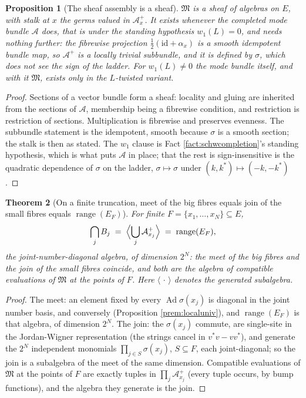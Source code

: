 \documentclass[11pt]{article}
\newtheorem{theorem}{Theorem}[section]
\newtheorem{proposition}[theorem]{Proposition}
\theoremstyle{definition}
\newcommand{\id}{\mathrm{id}}
\newcommand{\shL}{L}
\newcommand{\Aa}{\mathcal{A}}
\begin{document}
\begin{proposition}[The sheaf assembly is a sheaf]\label{prop:mlsheaf}
$\mathfrak{M}$ is a sheaf of algebras on $E$, with stalk at $x$ the germs valued in $\Aa_x^{+}$. It exists whenever the completed mode bundle $\Aa$ does, that is under the standing hypothesis $w_1(\shL) = 0$, and needs nothing further: the fibrewise projection $\tfrac12(\id + \alpha_x)$ is a smooth idempotent bundle map, so $\Aa^{+}$ is a locally trivial subbundle, and it is defined by $\sigma$, which does not see the sign of the ladder. For $w_1(\shL) \neq 0$ the mode bundle itself, and with it $\mathfrak{M}$, exists only in the $\shL$-twisted variant.
\end{proposition}

\begin{proof}
Sections of a vector bundle form a sheaf: locality and gluing are inherited from the sections of $\Aa$, membership being a fibrewise condition, and restriction is restriction of sections. Multiplication is fibrewise and preserves evenness. The subbundle statement is the idempotent, smooth because $\sigma$ is a smooth section; the stalk is then as stated. The $w_1$ clause is Fact \ref{fact:schwcompletion}'s standing hypothesis, which is what puts $\Aa$ in place; that the rest is sign-insensitive is the quadratic dependence of $\sigma$ on the ladder, $\sigma \mapsto \sigma$ under $(k, k^{*}) \mapsto (-k, -k^{*})$.
\end{proof}

\begin{theorem}[On a finite truncation, meet of the big fibres equals join of the small fibres equals $\operatorname{range}(E_F)$]\label{thm:mlmeet}
For finite $F = \{x_1, \dots, x_N\} \subseteq E$,
\[
\bigcap_{j} B_j \;=\; \Bigl\langle \bigcup_j \Aa_{x_j}^{+} \Bigr\rangle \;=\; \operatorname{range}(E_F),
\]
the joint-number-diagonal algebra, of dimension $2^N$: the meet of the big fibres and the join of the small fibres coincide, and both are the algebra of compatible evaluations of $\mathfrak{M}$ at the points of $F$. Here $\langle\,\cdot\,\rangle$ denotes the generated subalgebra.
\end{theorem}

\begin{proof}
The meet: an element fixed by every $\operatorname{Ad}\sigma(x_j)$ is diagonal in the joint number basis, and conversely (Proposition \ref{prem:localuniv}), and $\operatorname{range}(E_F)$ is that algebra, of dimension $2^N$. The join: the $\sigma(x_j)$ commute, are single-site in the Jordan-Wigner representation (the strings cancel in $v^{*}v - vv^{*}$), and generate the $2^N$ independent monomials $\prod_{j \in S}\sigma(x_j)$, $S \subseteq F$, each joint-diagonal; so the join is a subalgebra of the meet of the same dimension. Compatible evaluations of $\mathfrak{M}$ at the points of $F$ are exactly tuples in $\prod_j \Aa_{x_j}^{+}$ (every tuple occurs, by bump functions), and the algebra they generate is the join.
\end{proof}
\end{document}
